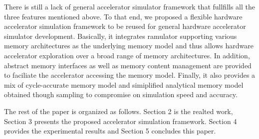 There is still a lack of general accelerator simulator framework that fullfills 
all the three features mentioned above. To that end, we proposed a flexible hardware accelerator 
simulation framework to be reused for general hardware accelerator simulator development. Basically, it 
integrates ramulator supporting various memory architectures as the underlying memory model and thus allows 
hardware accelerator exploration over a broad range of memory architectures. In addition, abstract memory 
interfaces as well as memory content management are provided to faciliate the accelerator accessing 
the memory model. Finally, it also provides a mix of cycle-accurate memory model and simiplified 
analytical memory model obtained though sampling to compromise on simulation speed and accuracy.

The rest of the paper is organized as follows. Section 2 is the realted work, Section 3 presents 
the proposed accelerator simulation framework. Section 4 provides the experimental results 
and Section 5 concludes this paper.





